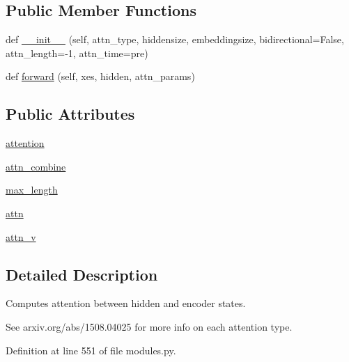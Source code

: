 \subsection*{Public Member Functions}
\begin{DoxyCompactItemize}
\item 
def \hyperlink{classparlai_1_1agents_1_1seq2seq_1_1modules_1_1AttentionLayer_aca18372fe25dbf5132ebcb2e63de31e3}{\+\_\+\+\_\+init\+\_\+\+\_\+} (self, attn\+\_\+type, hiddensize, embeddingsize, bidirectional=False, attn\+\_\+length=-\/1, attn\+\_\+time=\textquotesingle{}pre\textquotesingle{})
\item 
def \hyperlink{classparlai_1_1agents_1_1seq2seq_1_1modules_1_1AttentionLayer_a1c840562c4d3d0a715b4d5ddb1b8bafe}{forward} (self, xes, hidden, attn\+\_\+params)
\end{DoxyCompactItemize}
\subsection*{Public Attributes}
\begin{DoxyCompactItemize}
\item 
\hyperlink{classparlai_1_1agents_1_1seq2seq_1_1modules_1_1AttentionLayer_a8582ed1bb09a75d9a54e812a1b4ae648}{attention}
\item 
\hyperlink{classparlai_1_1agents_1_1seq2seq_1_1modules_1_1AttentionLayer_a38e130fe29ef52f03f78ba3c9a2ce4b9}{attn\+\_\+combine}
\item 
\hyperlink{classparlai_1_1agents_1_1seq2seq_1_1modules_1_1AttentionLayer_ac886c3ee00cb9163fed352af8aa53e0c}{max\+\_\+length}
\item 
\hyperlink{classparlai_1_1agents_1_1seq2seq_1_1modules_1_1AttentionLayer_a5bbb3d93ee56f0a41562141beb302da7}{attn}
\item 
\hyperlink{classparlai_1_1agents_1_1seq2seq_1_1modules_1_1AttentionLayer_a2b5f04f72da768b45739b7e9f1dd6705}{attn\+\_\+v}
\end{DoxyCompactItemize}


\subsection{Detailed Description}
\begin{DoxyVerb}Computes attention between hidden and encoder states.

See arxiv.org/abs/1508.04025 for more info on each attention type.
\end{DoxyVerb}
 

Definition at line 551 of file modules.\+py.




